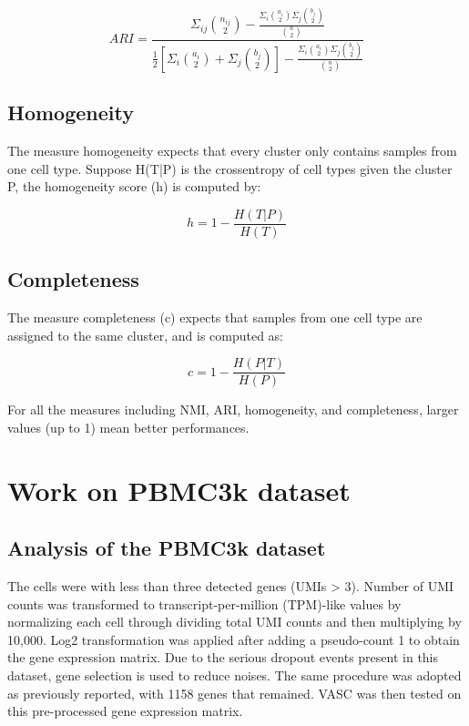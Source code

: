 \documentclass[12 pts]{article}
\begin{document}
\begin{equation}
ARI = \frac{\Sigma_{ij}{n_{ij} \choose 2}-\frac{\Sigma_i {a_i \choose 2}\Sigma_j {b_j \choose 2}}{{n \choose 2}}}{\frac{1}{2}[\Sigma_i {a_i \choose 2}+ \Sigma_j {b_j \choose 2}]-\frac{\Sigma_i {a_i \choose 2}\Sigma_j {b_j \choose 2}}{{n \choose 2}}}
\label{ARI}
\end{equation}

\subsection*{Homogeneity}
The measure homogeneity expects that every cluster only contains samples from one cell type. Suppose H(T|P) is the crossentropy of cell types given the cluster P, the homogeneity score (h) is computed by:

\begin{equation}
h = 1 - \frac{H(T|P)}{H(T)}
\label{Homogeneity}
\end{equation}

\subsection*{Completeness}
The measure completeness (c) expects that samples from one cell type are assigned to the same cluster, and is computed as:

\begin{equation}
c = 1 - \frac{H(P|T)}{H(P)}
\label{Completeness}
\end{equation}

For all the measures including NMI, ARI, homogeneity, and completeness, larger values (up to 1) mean better performances.

\section{Work on PBMC3k dataset}
\subsection{Analysis of the PBMC3k dataset}
The cells were with less than three detected genes (UMIs > 3). Number of UMI counts was transformed to transcript-per-million (TPM)-like values by normalizing each cell through dividing total UMI counts and then multiplying by 10,000. Log2 transformation was applied after adding a pseudo-count 1 to obtain the gene expression matrix. Due to the serious dropout events present in this dataset, gene selection is used to reduce noises. The same procedure was adopted as previously reported, with 1158 genes that remained. VASC was then tested on this pre-processed gene expression matrix. 
\end{document}
